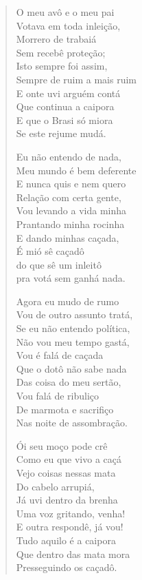 \begin{verse}
O meu avô e o meu pai\\
Votava em toda inleição,\\
Morrero de trabaiá\\
Sem recebê proteção;\\
Isto sempre foi assim,\\
Sempre de ruim a mais ruim\\
E onte uvi arguém contá\\
Que continua a caipora\\
E que o Brasi só miora\\
Se este rejume mudá.

Eu não entendo de nada,\\
Meu mundo é bem deferente\\
E nunca quis e nem quero\\
Relação com certa gente,\\
Vou levando a vida minha\\
Prantando minha rocinha\\
E dando minhas caçada,\\
É mió sê caçadô\\
do que sê um inleitô\\
pra votá sem ganhá nada.

Agora eu mudo de rumo\\
Vou de outro assunto tratá,\\
Se eu não entendo política,\\
Não vou meu tempo gastá,\\
Vou é falá de caçada\\
Que o dotô não sabe nada\\
Das coisa do meu sertão,\\
Vou falá de ribuliço\\
De marmota e sacrifiço\\
Nas noite de assombração.

Ói seu moço pode crê\\
Como eu que vivo a caçá\\
Vejo coisas nessas mata\\
Do cabelo arrupiá,\\
Já uvi dentro da brenha\\
Uma voz gritando, venha!\\
E outra respondê, já vou!\\
Tudo aquilo é a caipora\\
Que dentro das mata mora\\
Presseguindo os caçadô.


\end{verse}

